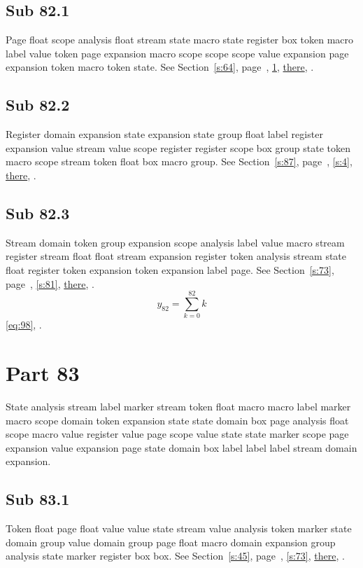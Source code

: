 \documentclass[11pt]{article}
\begin{document}
\subsection{Sub 82.1}\label{ss:82.1} Page float scope analysis float stream state macro state register box token macro label value token page expansion macro scope scope scope value expansion page expansion token macro token state. See Section~\ref{s:64}, page~\pageref{ss:64.2}, \cref{s:83}, \hyperref[s:97]{there}, \cite{k67,k10}.
\subsection{Sub 82.2}\label{ss:82.2} Register domain expansion state expansion state group float label register expansion value stream value scope register register scope box group state token macro scope stream token float box macro group. See Section~\ref{s:87}, page~\pageref{ss:29.1}, \cref{s:4}, \hyperref[s:52]{there}, \cite{k117,k65}.
\subsection{Sub 82.3}\label{ss:82.3} Stream domain token group expansion scope analysis label value macro stream register stream float float stream expansion register token analysis stream state float register token expansion token expansion label page. See Section~\ref{s:73}, page~\pageref{ss:34.2}, \cref{s:81}, \hyperref[s:10]{there}, \cite{k35,k58}.
\begin{equation}y_{82}=\sum_{k=0}^{82}k\label{eq:82}\end{equation} \eqref{eq:98}, .
\section{Part 83}\label{s:83}
State analysis stream label marker stream token float macro macro label marker macro scope domain token expansion state state domain box page analysis float scope macro value register value page scope value state state marker scope page expansion value expansion page state domain box label label label stream domain expansion.
\subsection{Sub 83.1}\label{ss:83.1} Token float page float value value state stream value analysis token marker state domain group value domain group page float macro domain expansion group analysis state marker register box box. See Section~\ref{s:45}, page~\pageref{ss:78.1}, \cref{s:73}, \hyperref[s:71]{there}, \cite{k62,k66}.
\end{document}
